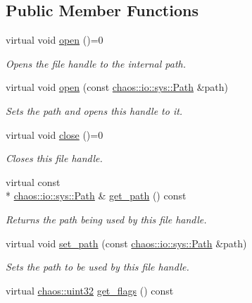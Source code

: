 \subsection*{Public Member Functions}
\begin{DoxyCompactItemize}
\item 
virtual void \hyperlink{classchaos_1_1io_1_1sys_1_1_file_handle_aaab721e850f11cd1f1bf3dba8e4ab2a1}{open} ()=0
\begin{DoxyCompactList}\small\item\em Opens the file handle to the internal path. \end{DoxyCompactList}\item 
virtual void \hyperlink{classchaos_1_1io_1_1sys_1_1_file_handle_ac38cdc6e3d48bba2d6e143265c7aaaad}{open} (const \hyperlink{classchaos_1_1io_1_1sys_1_1_path}{chaos\-::io\-::sys\-::\-Path} \&path)
\begin{DoxyCompactList}\small\item\em Sets the path and opens this handle to it. \end{DoxyCompactList}\item 
virtual void \hyperlink{classchaos_1_1io_1_1sys_1_1_file_handle_ac4dd796f7080d16fd2b141806e23f004}{close} ()=0
\begin{DoxyCompactList}\small\item\em Closes this file handle. \end{DoxyCompactList}\item 
\hypertarget{classchaos_1_1io_1_1sys_1_1_file_handle_aeb0c8615f3b16ceb7f9130b1482b3b42}{virtual const \\*
\hyperlink{classchaos_1_1io_1_1sys_1_1_path}{chaos\-::io\-::sys\-::\-Path} \& \hyperlink{classchaos_1_1io_1_1sys_1_1_file_handle_aeb0c8615f3b16ceb7f9130b1482b3b42}{get\-\_\-path} () const }\label{classchaos_1_1io_1_1sys_1_1_file_handle_aeb0c8615f3b16ceb7f9130b1482b3b42}

\begin{DoxyCompactList}\small\item\em Returns the path being used by this file handle. \end{DoxyCompactList}\item 
virtual void \hyperlink{classchaos_1_1io_1_1sys_1_1_file_handle_a14272fcf341c329bf15f7198b5e08573}{set\-\_\-path} (const \hyperlink{classchaos_1_1io_1_1sys_1_1_path}{chaos\-::io\-::sys\-::\-Path} \&path)
\begin{DoxyCompactList}\small\item\em Sets the path to be used by this file handle. \end{DoxyCompactList}\item 
\hypertarget{classchaos_1_1io_1_1sys_1_1_file_handle_a5cfd6d2ef58b86bf4a8b729a0825f508}{virtual \hyperlink{namespacechaos_a8641b3ae4551f0b35570d4f9f4ec22d9}{chaos\-::uint32} \hyperlink{classchaos_1_1io_1_1sys_1_1_file_handle_a5cfd6d2ef58b86bf4a8b729a0825f508}{get\-\_\-flags} () const }\label{classchaos_1_1io_1_1sys_1_1_file_handle_a5cfd6d2ef58b86bf4a8b729a0825f508}


\end{DoxyCompactItemize}
